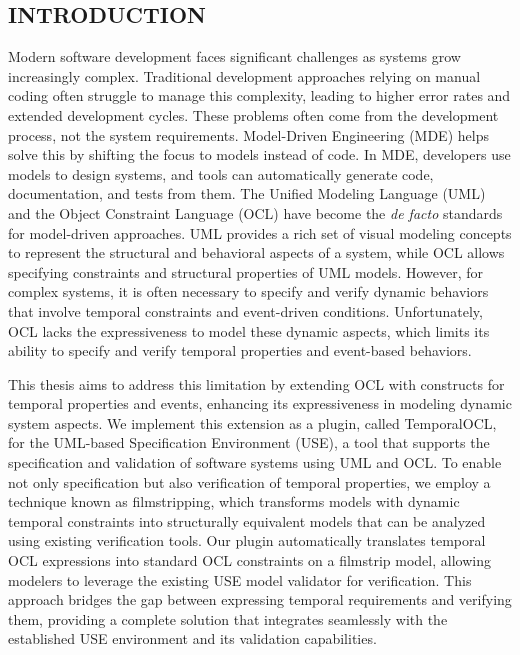 \setcounter{page}{1}


\setlength{\parindent}{1cm}

\begin{center}
  \section*{INTRODUCTION}
\end{center}

Modern software development faces significant challenges as
systems grow increasingly complex. Traditional development approaches relying on 
manual coding often struggle to manage this complexity, leading to higher error
rates and extended development cycles. These problems often come from the development 
process, not the system requirements. Model-Driven Engineering (MDE) helps solve 
this by shifting the focus to models instead of code. In MDE, developers use 
models to design systems, and tools can automatically generate code, documentation, 
and tests from them. The Unified Modeling Language (UML) and the Object Constraint 
Language (OCL) have become the \textit{de facto} standards for model-driven approaches. 
UML provides a rich set of visual modeling concepts to represent the structural 
and behavioral aspects of a system, while OCL allows specifying constraints and
structural properties of UML models. However, for complex systems, it is often necessary to
specify and verify dynamic behaviors that involve temporal constraints and event-driven
conditions. Unfortunately, OCL lacks the expressiveness to model these dynamic aspects,
which limits its ability to specify and verify temporal properties and event-based behaviors.

This thesis aims to address this limitation by extending OCL with constructs for
temporal properties and events, enhancing its expressiveness in modeling dynamic system aspects.
We implement this extension as a plugin, called TemporalOCL, for the UML-based Specification Environment (USE),
a tool that supports the specification and validation of software systems using UML and OCL.
To enable not only specification but also verification of temporal properties, we employ a technique
known as filmstripping, which transforms models with dynamic temporal constraints into structurally
equivalent models that can be analyzed using existing verification tools. Our plugin
automatically translates temporal OCL expressions into standard OCL constraints on a filmstrip model,
allowing modelers to leverage the existing USE model validator for verification. This approach bridges
the gap between expressing temporal requirements and verifying them, providing a complete solution that
integrates seamlessly with the established USE environment and its validation capabilities.

